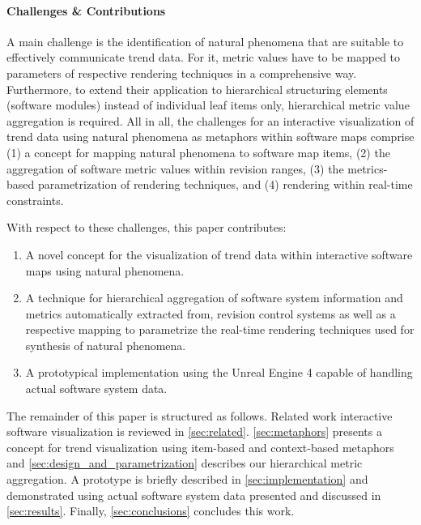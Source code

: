 \paragraph*{Challenges \& Contributions}
\noindent
A main challenge is the identification of natural phenomena that are suitable to effectively communicate trend data.
For it, metric values have to be mapped to parameters of respective rendering techniques in a comprehensive way. 
Furthermore, to extend their application to hierarchical structuring elements (\eg software modules) instead of individual leaf items only, hierarchical metric value aggregation is required. 
All in all, the challenges for an interactive visualization of trend data using natural phenomena as metaphors within software maps comprise
(1) a concept for mapping natural phenomena to software map items, 
(2) the aggregation of software metric values within revision ranges, 
(3) the metrics-based parametrization of rendering techniques, and 
(4) rendering within real-time constraints.

With respect to these challenges, this paper contributes:
\begin{enumerate}

	\item A novel concept for the visualization of trend data within interactive software maps using natural phenomena.

	\item A technique for hierarchical aggregation of software system information and metrics automatically extracted from, \eg revision control systems as well as a respective mapping to parametrize the real-time rendering techniques used for synthesis of natural phenomena.

	\item A prototypical implementation using the Unreal Engine 4 \cite{UnrealEngine4} capable of handling actual software system data.
	
\end{enumerate}

\noindent 
The remainder of this paper is structured as follows.
Related work \wrt interactive software visualization is reviewed in \autoref{sec:related}.
\autoref{sec:metaphors} presents a concept for trend visualization using item-based and context-based metaphors and \autoref{sec:design_and_parametrization} describes our hierarchical metric aggregation.
A prototype is briefly described in \autoref{sec:implementation} and demonstrated using actual software system data presented and discussed in \autoref{sec:results}. 
Finally, \autoref{sec:conclusions} concludes this work.

